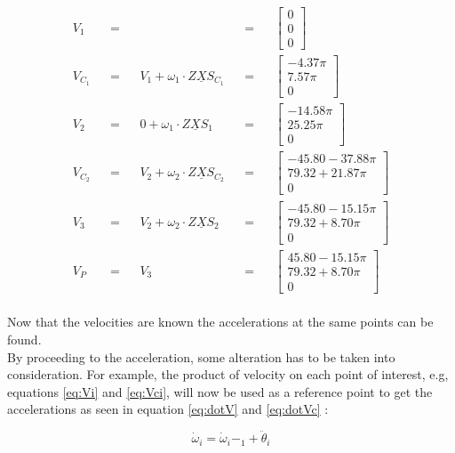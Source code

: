 \begin{align}
    V_1&&=&& &&=&&
\left[\begin{matrix}
    0\\
    0\\
    0
\end{matrix}\right]\\ V_C_1&&=&&V_1+\omega_1\cdot Z\underline{X}S_C_1&&=&&\left[\begin{matrix}
    -4.37\pi\\
    7.57\pi\\
    0
\end{matrix}\right]\\
    V_2&&=&&0+\omega_1\cdot Z\underline{X}S_1&&=&&
\left[\begin{matrix}
    -14.58\pi\\
    25.25\pi\\
    0
\end{matrix}\right]\\ V_C_2&&=&&V_2+\omega_2\cdot Z\underline{X}S_C_2&&=&&
\left[\begin{matrix}
   -45.80-37.88\pi \\
    79.32+21.87\pi\\
    0
\end{matrix}\right]\\
    V_3&&=&&V_2+\omega_2\cdot Z\underline{X}S_2&&=&&
\left[\begin{matrix}
    -45.80-15.15\pi\\
    79.32+8.70\pi\\
    0
\end{matrix}\right]\\ V_P&&=&&V_3&&=&&\left[\begin{matrix}
    45.80-15.15\pi\\
    79.32+8.70\pi\\
    0
\end{matrix}\right]
\end{align}
\\
Now that the velocities are known the accelerations at the same points can be found.\\
By proceeding to the acceleration, some alteration has to be taken into consideration. For example, the product of velocity on each point of interest, e.g, equations \ref{eq:Vi} and \ref{eq:Vci}, will now be used as a reference point to get the accelerations as seen in equation \ref{eq:dotV} and \ref{eq:dotVc} :

\begin{equation}\label{eq:dotomega}
\dot\omega_i=\dot\omega_i-_1+\ddot\theta_i
\end{equation}

